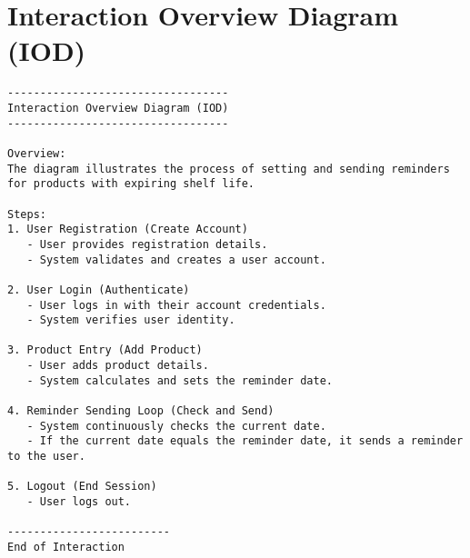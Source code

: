 \section{Interaction Overview Diagram (IOD)}
\begin{verbatim}
----------------------------------
Interaction Overview Diagram (IOD)
----------------------------------

Overview:
The diagram illustrates the process of setting and sending reminders for products with expiring shelf life.

Steps:
1. User Registration (Create Account)
   - User provides registration details.
   - System validates and creates a user account.

2. User Login (Authenticate)
   - User logs in with their account credentials.
   - System verifies user identity.

3. Product Entry (Add Product)
   - User adds product details.
   - System calculates and sets the reminder date.

4. Reminder Sending Loop (Check and Send)
   - System continuously checks the current date.
   - If the current date equals the reminder date, it sends a reminder to the user.

5. Logout (End Session)
   - User logs out.

-------------------------
End of Interaction
\end{verbatim}